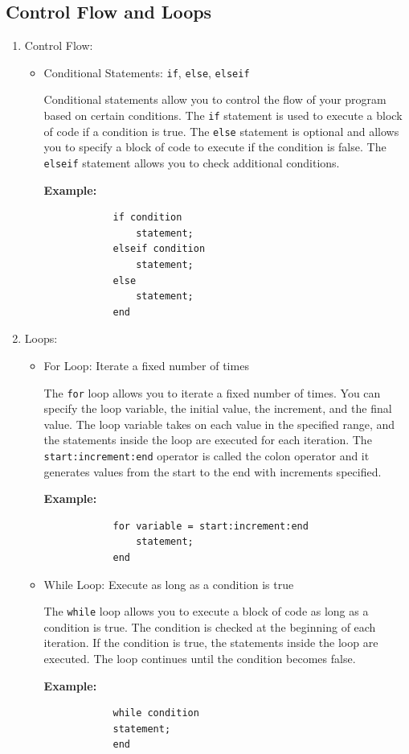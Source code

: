 \documentclass[
11pt, %
a4paper, %
oneside, %
headinclude,footinclude, %
BCOR5mm, %
]{scrartcl}
\begin{document}
\subsection{Control Flow and Loops}
    \begin{enumerate}
	\item Control Flow:
	\begin{itemize}
		\item Conditional Statements: \texttt{if}, \texttt{else}, \texttt{elseif}
		
		Conditional statements allow you to control the flow of your program based on certain conditions. The \texttt{if} statement is used to execute a block of code if a condition is true. The \texttt{else} statement is optional and allows you to specify a block of code to execute if the condition is false. The \texttt{elseif} statement allows you to check additional conditions.
		
		\textbf{Example:}
		\begin{verbatim}
			if condition
			    statement;
			elseif condition
			    statement;
			else
			    statement;
			end
		\end{verbatim}
	\end{itemize}
	
	\item Loops:
	\begin{itemize}
		\item For Loop: Iterate a fixed number of times
		
		The \texttt{for} loop allows you to iterate a fixed number of times. You can specify the loop variable, the initial value, the increment, and the final value. The loop variable takes on each value in the specified range, and the statements inside the loop are executed for each iteration.
		\newline
		The \texttt{start:increment:end} operator is called the colon operator and it generates values from the start to the end with increments specified.
		
		\textbf{Example:}
		\begin{verbatim}
			for variable = start:increment:end
			    statement;
			end
		\end{verbatim}
		
		\item While Loop: Execute as long as a condition is true
		
		The \texttt{while} loop allows you to execute a block of code as long as a condition is true. The condition is checked at the beginning of each iteration. If the condition is true, the statements inside the loop are executed. The loop continues until the condition becomes false.
		
		\textbf{Example:}
		\begin{verbatim}
			while condition
			statement;
			end
		\end{verbatim}
	\end{itemize}
\end{enumerate}
\end{document}
